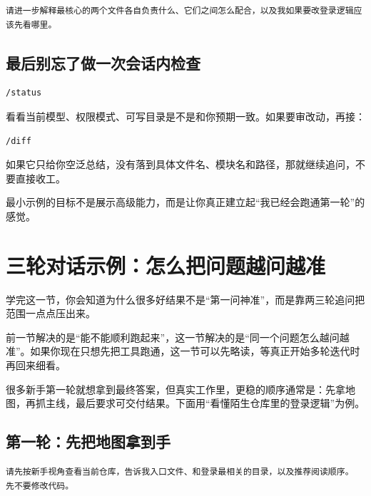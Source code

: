 \documentclass[UTF8,a4paper,12pt]{ctexart}
\begin{document}
\begin{lstlisting}[style=prompt]
请进一步解释最核心的两个文件各自负责什么、它们之间怎么配合，以及我如果要改登录逻辑应该先看哪里。
\end{lstlisting}

\subsection{最后别忘了做一次会话内检查}

\begin{lstlisting}[style=cli]
/status
\end{lstlisting}

看看当前模型、权限模式、可写目录是不是和你预期一致。如果要审改动，再接：

\begin{lstlisting}[style=cli]
/diff
\end{lstlisting}

\begin{warnbox}
如果它只给你空泛总结，没有落到具体文件名、模块名和路径，那就继续追问，不要直接收工。
\end{warnbox}

\begin{sumbox}
最小示例的目标不是展示高级能力，而是让你真正建立起“我已经会跑通第一轮”的感觉。
\end{sumbox}

\section{三轮对话示例：怎么把问题越问越准}

\begin{learnbox}
学完这一节，你会知道为什么很多好结果不是“第一问神准”，而是靠两三轮追问把范围一点点压出来。
\end{learnbox}

前一节解决的是“能不能顺利跑起来”，这一节解决的是“同一个问题怎么越问越准”。如果你现在只想先把工具跑通，这一节可以先略读，等真正开始多轮迭代时再回来细看。

很多新手第一轮就想拿到最终答案，但真实工作里，更稳的顺序通常是：先拿地图，再抓主线，最后要求可交付结果。下面用“看懂陌生仓库里的登录逻辑”为例。

\subsection{第一轮：先把地图拿到手}

\begin{lstlisting}[style=prompt]
请先按新手视角查看当前仓库，告诉我入口文件、和登录最相关的目录，以及推荐阅读顺序。
先不要修改代码。
\end{lstlisting}
\end{document}
